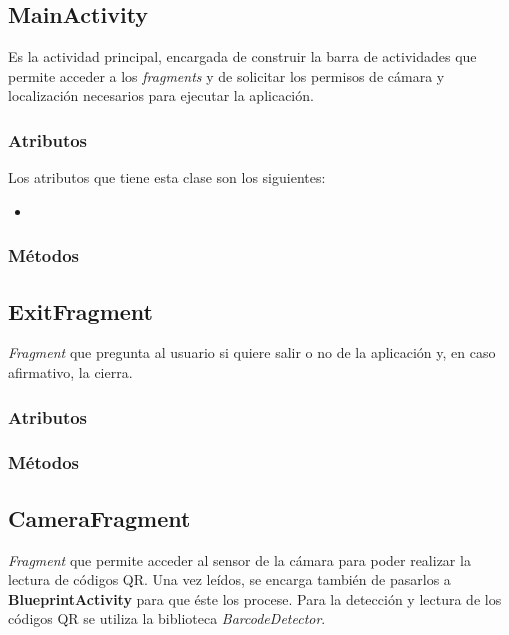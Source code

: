 \documentclass[11pt,a4paper]{article}
\begin{document}
\subsection{\textbf{MainActivity}}
\label{sec:main}

Es la actividad principal, encargada de construir la barra de actividades que permite acceder
a los \textit{fragments} y de solicitar los permisos de cámara y localización necesarios para ejecutar
la aplicación.

\subsubsection{Atributos}

Los atributos que tiene esta clase son los siguientes:

\begin{itemize}
    \item 
\end{itemize}

\subsubsection{Métodos}


\subsection{\textbf{ExitFragment}}
\label{sec:exit}

\textit{Fragment} que pregunta al usuario si quiere salir o no de la aplicación y, en caso afirmativo, la cierra.

\subsubsection{Atributos}

\subsubsection{Métodos}

\subsection{\textbf{CameraFragment}}
\label{sec:camera}

\textit{Fragment} que permite acceder al sensor de la cámara para poder realizar la lectura
de códigos QR. Una vez leídos, se encarga también de pasarlos a \textbf{BlueprintActivity} para que éste los procese.
Para la detección y lectura de los códigos QR se utiliza la biblioteca \textit{BarcodeDetector}.
\end{document}
